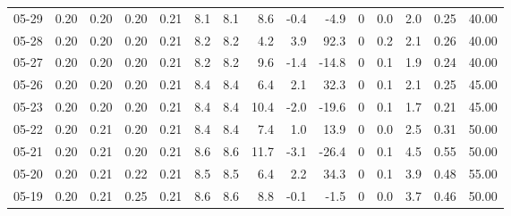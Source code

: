 \begin{threeparttable}
{\begin{tabular}{lrrrrrrrrrrrrrr}
  05-29 &          0.20 &          0.20 &          0.20 &        0.21 &                 8.1 &                8.1 &                 8.6 &       -0.4 &         -4.9 &              0 &                 0.0 &              2.0 &            0.25 &                  40.00 \\
  05-28 &          0.20 &          0.20 &          0.20 &        0.21 &                 8.2 &                8.2 &                 4.2 &        3.9 &         92.3 &              0 &                 0.2 &              2.1 &            0.26 &                  40.00 \\
  05-27 &          0.20 &          0.20 &          0.20 &        0.21 &                 8.2 &                8.2 &                 9.6 &       -1.4 &        -14.8 &              0 &                 0.1 &              1.9 &            0.24 &                  40.00 \\
  05-26 &          0.20 &          0.20 &          0.20 &        0.21 &                 8.4 &                8.4 &                 6.4 &        2.1 &         32.3 &              0 &                 0.1 &              2.1 &            0.25 &                  45.00 \\
  05-23 &          0.20 &          0.20 &          0.20 &        0.21 &                 8.4 &                8.4 &                10.4 &       -2.0 &        -19.6 &              0 &                 0.1 &              1.7 &            0.21 &                  45.00 \\
  05-22 &          0.20 &          0.21 &          0.20 &        0.21 &                 8.4 &                8.4 &                 7.4 &        1.0 &         13.9 &              0 &                 0.0 &              2.5 &            0.31 &                  50.00 \\
  05-21 &          0.20 &          0.21 &          0.20 &        0.21 &                 8.6 &                8.6 &                11.7 &       -3.1 &        -26.4 &              0 &                 0.1 &              4.5 &            0.55 &                  50.00 \\
  05-20 &          0.20 &          0.21 &          0.22 &        0.21 &                 8.5 &                8.5 &                 6.4 &        2.2 &         34.3 &              0 &                 0.1 &              3.9 &            0.48 &                  55.00 \\
  05-19 &          0.20 &          0.21 &          0.25 &        0.21 &                 8.6 &                8.6 &                 8.8 &       -0.1 &         -1.5 &              0 &                 0.0 &              3.7 &            0.46 &                  50.00 \\

\end{tabular}}
\end{threeparttable}
